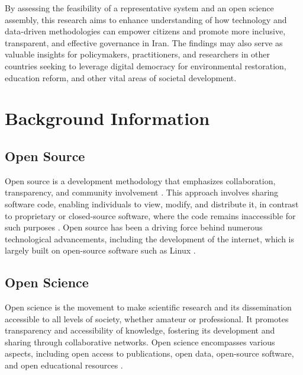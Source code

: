 \documentclass{IEEEtran}
\begin{document}

By assessing the feasibility of a representative system and an open science assembly, this research aims to enhance understanding of how technology and data-driven methodologies can empower citizens and promote more inclusive, transparent, and effective governance in Iran. The findings may also serve as valuable insights for policymakers, practitioners, and researchers in other countries seeking to leverage digital democracy for environmental restoration, education reform, and other vital areas of societal development.

\section{Background Information}

\subsection{Open Source}
Open source is a development methodology that emphasizes collaboration, transparency, and community involvement \cite{dibona1999opensource}. This approach involves sharing software code, enabling individuals to view, modify, and distribute it, in contrast to proprietary or closed-source software, where the code remains inaccessible for such purposes \cite{dibona1999opensource}. Open source has been a driving force behind numerous technological advancements, including the development of the internet, which is largely built on open-source software such as Linux \cite{dibona1999opensource}.

\subsection{Open Science}
Open science is the movement to make scientific research and its dissemination accessible to all levels of society, whether amateur or professional. It promotes transparency and accessibility of knowledge, fostering its development and sharing through collaborative networks. Open science encompasses various aspects, including open access to publications, open data, open-source software, and open educational resources \cite{nielsen2011reinventing}.
\end{document}
